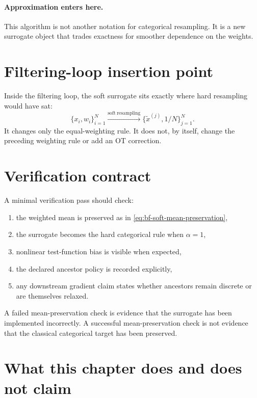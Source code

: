\paragraph{Approximation enters here.}
This algorithm is not another notation for categorical resampling.  It is a new
surrogate object that trades exactness for smoother dependence on the weights.

\section{Filtering-loop insertion point}
\label{sec:bf-soft-loop}

Inside the filtering loop, the soft surrogate sits exactly where hard resampling
would have sat:
\begin{equation}
\label{eq:bf-soft-loop}
  \{x_i,w_i\}_{i=1}^N
  \xrightarrow{\mathrm{soft\ resampling}}
  \{\tilde x^{(j)},1/N\}_{j=1}^N.
\end{equation}
It changes only the equal-weighting rule.  It does not, by itself, change the
preceding weighting rule or add an OT correction.

\section{Verification contract}
\label{sec:bf-soft-verification}

A minimal verification pass should check:
\begin{enumerate}[label=(\arabic*)]
  \item the weighted mean is preserved as in
  \eqref{eq:bf-soft-mean-preservation},
  \item the surrogate becomes the hard categorical rule when \(\alpha=1\),
  \item nonlinear test-function bias is visible when expected,
  \item the declared ancestor policy is recorded explicitly,
  \item any downstream gradient claim states whether ancestors remain discrete or
  are themselves relaxed.
\end{enumerate}

A failed mean-preservation check is evidence that the surrogate has been
implemented incorrectly.  A successful mean-preservation check is not evidence
that the classical categorical target has been preserved.

\section{What this chapter does and does not claim}
\label{sec:bf-soft-boundary}


